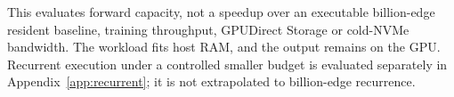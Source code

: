 
\FloatBarrier

This evaluates forward capacity, not a speedup over an executable billion-edge
resident baseline, training throughput, GPUDirect Storage or cold-NVMe bandwidth.
The workload fits host RAM, and the output remains on the GPU. Recurrent
execution under a controlled smaller budget is evaluated separately in
Appendix~\ref{app:recurrent}; it is not extrapolated to billion-edge recurrence.
\FloatBarrier
